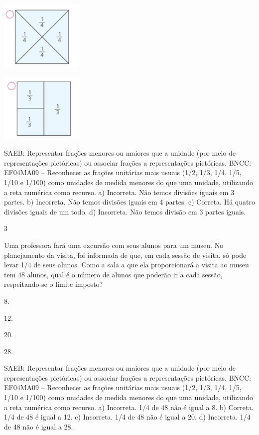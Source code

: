 \begin{mdframed}[linewidth=2pt,linecolor=salmao,roundcorner=2pt]
\begin{escolha}
{{\includegraphics[width=1.56680in,height=1.31678in]{media/image125.png}

\begin{escolha}
\item
\end{escolha}

\includegraphics[width=1.58347in,height=1.30845in]{media/image126.png}

SAEB: Representar frações menores ou maiores que a unidade (por meio de representações
pictóricas) ou associar frações a representações pictóricas.
BNCC: EF04MA09 -- Reconhecer as frações unitárias mais usuais (1/2, 1/3, 1/4, 1/5, 1/10 e 1/100) como
unidades de medida menores do que uma unidade, utilizando a reta numérica como recurso.
a)  Incorreta. Não temos divisões iguais em 3 partes.
b)  Incorreta. Não temos divisões iguais em 4 partes.
c)  Correta. Há quatro divisões iguais de um todo.
d)  Incorreta. Não temos divisão em 3 partes iguais.


\num{3}

Uma professora fará uma excursão com seus alunos para um museu. No
planejamento da visita, foi informada de que, em cada sessão de visita, só
pode levar 1/4 de seus alunos. Como a sala a que ela proporcionará a
visita ao museu tem 48 alunos, qual é o número de alunos que poderão ir a
cada sessão, respeitando-se o limite imposto?

\begin{escolha}
\item
  8.
\item
  12.
\item
  20.
\item
  28.
\end{escolha}

SAEB: Representar frações menores ou maiores que a unidade (por meio de representações
pictóricas) ou associar frações a representações pictóricas.
BNCC: EF04MA09 -- Reconhecer as frações unitárias mais usuais (1/2, 1/3, 1/4, 1/5, 1/10 e 1/100) como
unidades de medida menores do que uma unidade, utilizando a reta numérica como recurso.
a)  Incorreta. 1/4 de 48 não é igual a 8.
b)  Correta. 1/4 de 48 é igual a 12.
c)  Incorreta. 1/4 de 48 não é igual a 20.
d)  Incorreta. 1/4 de 48 não é igual a 28.

}}
\end{escolha}
\end{mdframed}
